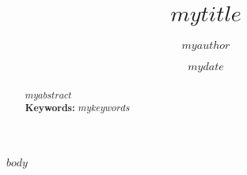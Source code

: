 \documentclass{article} %
\title{$mytitle$}
\author{$myauthor$}
\date{$mydate$}
\begin{document}
\maketitle

\begin{abstract}
$myabstract$ \\[10pt]
\textbf{Keywords:} \textit{$mykeywords$}
\end{abstract}

\begin{multicols*}{2}
$body$
\end{multicols*}
\end{document}
